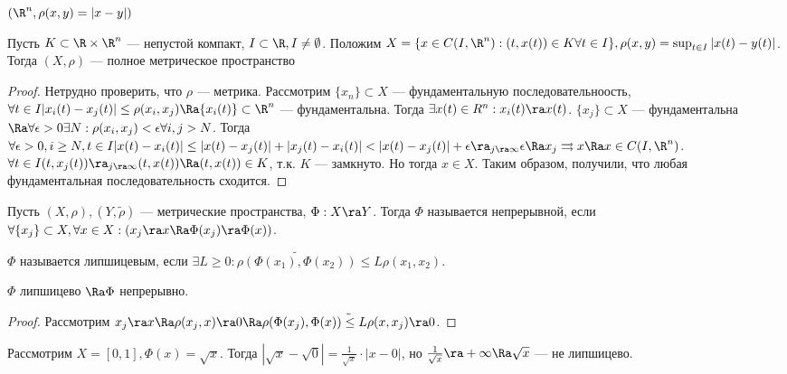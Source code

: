 \begin{example}
	\((\R^n, \rho(x, y) = |x - y|)\)
\end{example}

\begin{example}
	Пусть \(K \subset \R \times \R^n\) --- непустой компакт, \(I \subset \R, I \ne \emptyset\). Положим \(X = \{x \in C(I, \R^n): (t, x(t)) \in K \forall t \in I\}, \rho(x, y) = \sup_{t \in I}|x(t) - y(t)|\). Тогда \((X, \rho)\) --- полное метрическое пространство
\end{example}
\begin{proof}
	Нетрудно проверить, что \(\rho\) --- метрика. Рассмотрим \(\{x_n\} \subset X\) --- фундаментальную последовательноость, \(\forall t \in I |x_i(t) - x_j(t)| \le \rho(x_i, x_j) \Ra \{x_i(t)\} \subset \R^n\) --- фундаментальна. Тогда \(\exists x(t) \in R^n: x_i(t) \ra x(t)\). \(\{x_j\} \subset X\) --- фундаментальна \(\Ra \forall \epsilon > 0 \exists N: \rho(x_i, x_j) < \epsilon \forall i, j > N\). Тогда \(\forall \epsilon > 0, i \ge N, t \in I |x(t) - x_i(t)| \le |x(t) - x_j(t)| + |x_j(t) - x_i(t)| < |x(t) - x_j(t)| + \epsilon \ra_{j \ra \infty} \epsilon \Ra x_j \rightrightarrows x \Ra x \in C(I, \R^n)\). \(\forall t \in I (t, x_j(t)) \ra_{j \ra \infty} (t, x(t)) \Ra (t, x(t)) \in K\), т.к. \(K\) --- замкнуто. Но тогда \(x \in X\). Таким образом, получили, что любая фундаментальная последовательность сходится.
\end{proof}

\begin{definition}
	Пусть \((X, \rho), (Y, \tilde{\rho})\) --- метрические пространства, \(\Phi: X \ra Y\). Тогда \(\Phi\) называется непрерывной, если \(\forall \{x_j\} \subset X, \forall x \in X: (x_j \ra x \Ra \Phi(x_j) \ra \Phi(x))\).
\end{definition}

\begin{definition}
	\(\Phi\) называется липшицевым, если \(\exists L \ge 0: \tilde{\rho(\Phi(x_1), \Phi(x_2))} \le L \rho(x_1, x_2)\).
\end{definition}

\begin{proposition}
	\(\Phi\) липшицево \(\Ra \Phi\) непрерывно.
\end{proposition}
\begin{proof}
	Рассмотрим \(x_j \ra x \Ra \rho(x_j, x) \ra 0 \Ra \tilde{\rho(\Phi(x_j), \Phi(x)) \le L\rho(x, x_j) \ra 0}\).
\end{proof}

\begin{example}
	Рассмотрим \(X = [0, 1], \Phi(x) = \sqrt{x}\). Тогда \(|\sqrt{x} - \sqrt{0}| = \frac{1}{\sqrt{x}}\cdot |x - 0|\), но \(\frac{1}{\sqrt{x}} \ra +\infty \Ra \sqrt{x}\) --- не липшицево.
\end{example}

